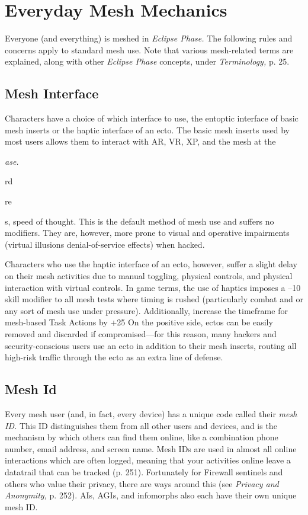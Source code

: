\section{Everyday Mesh Mechanics}

Everyone (and everything) is meshed in \textit{Eclipse Phase. }
The following rules and concerns apply to standard 
mesh use. Note that various mesh-related terms are 
explained, along with other \textit{Eclipse Phase }concepts, 
under \textit{Terminology,} p. 25.

\subsection{Mesh Interface}

Characters have a choice of which interface to use, the 
entoptic interface of basic mesh inserts or the haptic 
interface of an ecto.
The basic mesh inserts used by most users allows 
them to interact with AR, VR, XP, and the mesh at the 

\textit{ase.}

rd 

re 

s, 
speed of thought. This is the default method of mesh 
use and suffers no modifiers. They are, however, more 
prone to visual and operative impairments (virtual illusions
denial-of-service effects) when hacked.

Characters who use the haptic interface of an ecto, 
however, suffer a slight delay on their mesh activities 
due to manual toggling, physical controls, and physical
interaction with virtual controls. In game terms,
the use of haptics imposes a –10 skill modifier  to 
all mesh tests where timing is rushed (particularly 
combat and or any sort of mesh use under pressure). 
Additionally, increase the timeframe for mesh-based 
Task Actions by +25%
On the positive side, ectos can be easily removed and 
discarded if compromised—for this reason, many 
hackers and security-conscious users use an ecto in 
addition to their mesh inserts, routing all high-risk 
traffic through the ecto as an extra line of defense.

\subsection{Mesh Id}

Every mesh user (and, in fact, every device) has a 
unique code called their \textit{mesh ID.} This ID distinguishes
them from all other users and devices, and is
the mechanism by which others can find them online, 
like a combination phone number, email address, and 
screen name. Mesh IDs are used in almost all online interactions
which are often logged, meaning that your
activities online leave a datatrail that can be tracked 
(p. 251). Fortunately for Firewall sentinels and others 
who value their privacy, there are ways around this 
(see \textit{Privacy and Anonymity,} p. 252). AIs, AGIs, and 
infomorphs also each have their own unique mesh ID.

